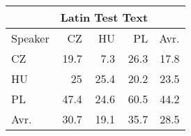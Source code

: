 \begin{tabular}{l|rrr|r}
\hline
 & \multicolumn{3}{c}{Latin Test Text} & \\
\hline
 Speaker   &   CZ &   HU &   PL &   Avr. \\
\hline
 CZ        & 19.7 &  7.3 & 26.3 &   17.8 \\
 HU        & 25   & 25.4 & 20.2 &   23.5 \\
 PL        & 47.4 & 24.6 & 60.5 &   44.2 \\
\hline
 Avr.     & 30.7 & 19.1 & 35.7 &   28.5 \\
\hline
\end{tabular}
